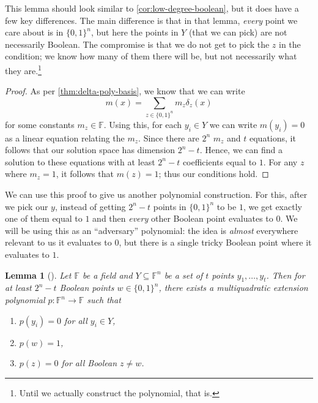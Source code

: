 \documentclass[english,12pt]{reedthesis}
\theoremstyle{plain}
\newtheorem{lemma}[lemma]{Lemma}
\theoremstyle{definition}
\theoremstyle{remark}
\begin{document}
This lemma should look similar to \cref{cor:low-degree-boolean}, but it does
have a few key differences. The main difference is that in that lemma,
\emph{every} point we care about is in $\{0, 1\}^{n}$, but here the points in
$Y$ (that we can pick) are not necessarily Boolean. The compromise is that we do
not get to pick the $z$ in the condition; we know how many of them there will
be, but not necessarily what they are.\footnote{Until we actually construct the
  polynomial, that is.}

\begin{proof}
  As per \cref{thm:delta-poly-basis}, we know that we can write
  \begin{equation}
    m(x) = \sum_{z \in \{0, 1\}^{n}}m_{z}\delta_{z}(x)
  \end{equation}
  for some constants $m_{z} \in \mathbb{F}$. Using this, for each $y_{i} \in Y$ we
  can write $m(y_{i}) = 0$ as a linear equation relating the $m_{z}$. Since
  there are $2^{n}$ $m_{z}$ and $t$ equations, it follows that our solution
  space has dimension $2^{n} - t$. Hence, we can find a solution to these
  equations with at least $2^{n} - t$ coefficients equal to $1$. For any $z$
  where $m_{z} = 1$, it follows that $m(z) = 1$; thus our conditions hold.
\end{proof}

We can use this proof to give us another polynomial construction. For this,
after we pick our $y$, instead of getting $2^{n} - t$ points in $\{0, 1\}^{n}$
to be $1$, we get exactly one of them equal to $1$ and then \emph{every} other
Boolean point evaluates to $0$. We will be using this as an ``adversary''
polynomial: the idea is \emph{almost} everywhere relevant to us it evaluates to
$0$, but there is a single tricky Boolean point where it evaluates to $1$.

\begin{lemma}[{\cite[Lemma 4.3]{AW09}}]\label{thm:multiquad-extension}
  Let $\mathbb{F}$ be a field and $Y \subseteq \mathbb{F}^{n}$ be a set of $t$ points
  $y_{1}, \ldots, y_{t}$. Then for at least $2^{n} - t$ Boolean points
  $w \in \{0, 1\}^{n}$, there exists a multiquadratic extension polynomial
  $p\colon \mathbb{F}^{n} \rightarrow \mathbb{F}$ such that
  \begin{enumerate}
    \item $p(y_{i}) = 0$ for all $y_{i} \in Y$,
    \item $p(w) = 1$,
    \item $p(z) = 0$ for all Boolean $z \ne w$.
  \end{enumerate}
\end{lemma}
\end{document}
